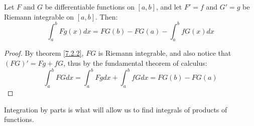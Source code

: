 \begin{theorem}\label{7.3.3}
    Let $F$ and  $G$ be differentiable functions on  $[a,b]$, and let  $F'=f$
    and  $G'=g$  be Riemann integrable on $ [a,b]$. Then:
        \begin{equation}
            \int_{a}^{b}{Fg(x) dx}=FG(b)-FG(a)-\int_{a}^{b}{fG(x) dx}
        \end{equation}
\end{theorem}
\begin{proof}
    By theorem \ref{7.2.2},  $FG$ is Riemann integrable, and also notice that
    $(FG)'=Fg+fG$, thus by the fundamental theorem of calculus:
        \begin{equation*}
            \int_{a}^{b}{FG dx}=\int_{a}^{b}{Fg dx}+\int_{a}^{b}{fG dx}=FG(b)-FG(a)
        \end{equation*}
\end{proof}
\begin{remark}
    Integration by parts is what will allow us to find integrals of products of
    functions.
\end{remark}

